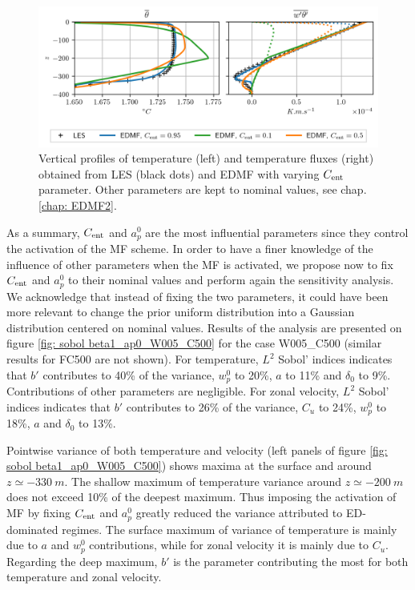 \documentclass[draft]{agujournal2019}
\begin{document}
%
\begin{figure}
    \includegraphics[width=\textwidth]{figures/FC50072h_t_wt.png}
    \caption{Vertical profiles of temperature (left) and temperature fluxes (right) obtained from LES (black dots) and EDMF with varying $C_{\rm ent}$ parameter. Other parameters are kept to nominal values, see chap. \ref{chap: EDMF2}.}
    \label{fig: beta1 FC500}
\end{figure}
%
%
\par As a summary, $C_{\rm ent}$ and $a_p^0$ are the most influential parameters since they control the activation of the MF scheme. In order to have a finer knowledge of the influence of other parameters when the MF is activated, we propose now to fix $C_{\rm ent}$ and $a_p^0$ to their nominal values and perform again the sensitivity analysis. We acknowledge that instead of fixing the two parameters, it could have been more relevant to change the prior uniform distribution into a Gaussian distribution centered on nominal values. Results of the analysis are presented on figure \ref{fig: sobol beta1_ap0_W005_C500} for the case W005\_C500 (similar results for FC500 are not shown). For temperature, $L^2$ Sobol' indices indicates that $b'$ contributes to 40\% of the variance, $w_p^0$ to 20\%, $a$ to 11\% and $\delta_0$ to 9\%. Contributions of other parameters are negligible. For zonal velocity, $L^2$ Sobol' indices indicates that $b'$ contributes to 26\% of the variance, $C_u$ to 24\%, $w_p^0$ to 18\%, $a$ and $\delta_0$ to 13\%.  
%
\par Pointwise variance of both temperature and velocity (left panels of figure \ref{fig: sobol beta1_ap0_W005_C500}) shows maxima at the surface and around $z \simeq \SI{-330}{m}$. The shallow maximum of temperature variance around $z \simeq \SI{-200}{m}$ does not exceed 10\% of the deepest maximum. Thus imposing the activation of MF by fixing $C_{\rm ent}$ and $a_p^0$ greatly reduced the variance attributed to ED-dominated regimes. The surface maximum of variance of temperature is mainly due to $a$ and $w_p^0$ contributions, while for zonal velocity it is mainly due to $C_u$. Regarding the deep maximum, $b'$ is the parameter contributing the most for both temperature and zonal velocity.   
\end{document}
